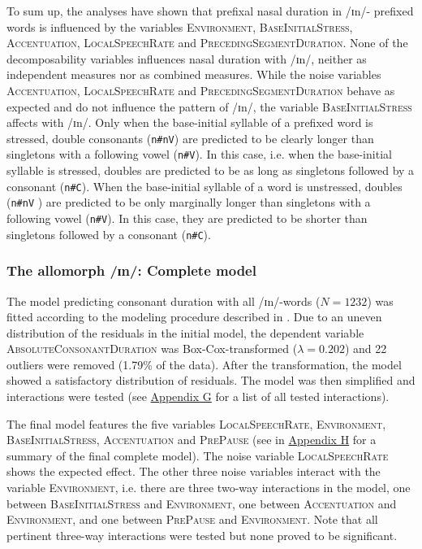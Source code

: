To sum up, the analyses have shown that prefixal nasal duration in /ɪn/- prefixed words is influenced by the variables \textsc{Environment}, \textsc{BaseInitialStress}, \textsc{Accentuation}, \textsc{LocalSpeechRate} and \textsc{PrecedingSegmentDuration}. None of the decomposability variables influences nasal duration with /ɪn/, neither as independent measures nor as combined measures. 
While the noise variables \textsc{Accentuation}, \textsc{LocalSpeechRate} and \textsc{PrecedingSegmentDuration} behave as expected and do not influence the  pattern of /ɪn/, the variable \textsc{BaseInitialStress} affects  with /ɪn/. 
Only when the base-initial syllable of a prefixed word is stressed, double consonants (\texttt{n\#nV}) are predicted to be clearly longer than singletons with a following vowel (\texttt{n\#V}). In this case, i.e. when the base-initial syllable is stressed, doubles are predicted to be as long as singletons followed by a consonant (\texttt{n\#C}). When the base-initial syllable of a word is unstressed, doubles (\texttt{n\#nV} ) are predicted to be only marginally longer than singletons with a following vowel (\texttt{n\#V}). In this case, they are predicted to be shorter than singletons followed by a consonant (\texttt{n\#C}).

\subsubsection{The allomorph /ɪn/: Complete model}


The model predicting consonant duration with all /ɪn/-words ($N=1232$) was fitted according to the modeling procedure described in . Due to an uneven distribution of the residuals in the initial model, the dependent variable \textsc{AbsoluteConsonantDuration} was Box-Cox-transformed ($\lambda = 0.202$) and 22 outliers were removed (1.79\% of the data). 
After the transformation, the model showed a satisfactory distribution of residuals. The model was then simplified and interactions were tested (see \hyperref[Appendix G Summaries of tested interactions in experimental study]{Appendix G} for a list of all tested interactions).




The final model features the five variables \textsc{LocalSpeechRate}, \textsc{Environment}, \textsc{BaseInitialStress}, \textsc{Accentuation} and \textsc{PrePause} (see  in \hyperref[Appendix H: Model Summaries Experiment]{Appendix H} for a summary of the final complete model). 
The noise variable \textsc{LocalSpeechRate} shows the expected effect. The other three noise variables interact with the variable \textsc{Environment}, i.e. there are three two-way interactions in the model, one between \textsc{BaseInitialStress} and \textsc{Environment}, one between \textsc{Accentuation} and \textsc{Environment}, and one between \textsc{PrePause} and \textsc{Environment}.  Note that all pertinent three-way interactions were tested but none proved to be significant.


